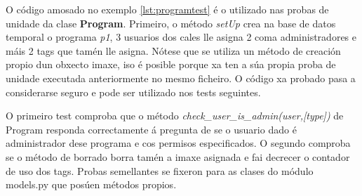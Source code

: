 O código amosado no exemplo \ref{lst:programtest} é o utilizado nas probas de unidade da clase \textbf{Program}. Primeiro, o método \textit{setUp} crea na base de datos temporal o programa \textit{p1}, 3 usuarios dos cales lle asigna 2 coma administradores e máis 2 tags que tamén lle asigna. Nótese que se utiliza un método de creación propio dun obxecto imaxe, iso é posible porque xa ten a súa propia proba de unidade executada anteriormente no mesmo ficheiro. O código xa probado pasa a considerarse seguro e pode ser utilizado nos tests seguintes.

O primeiro test comproba que o método \textit{check\_user\_is\_admin(user,[type])} de Program responda correctamente á pregunta de se o usuario dado é administrador dese programa e cos permisos especificados. O segundo comproba se o método de borrado borra tamén a imaxe asignada e fai decrecer o contador de uso dos tags. Probas semellantes se fixeron para as clases do módulo models.py que posúen métodos propios.


